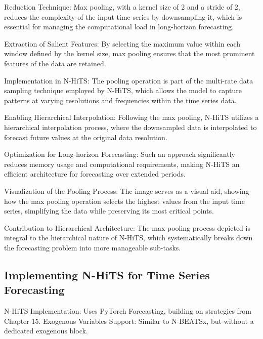 \documentclass{article}
\begin{document}
Reduction Technique: Max pooling, with a kernel size of 2 and a stride of 2, reduces the complexity of the input time series by downsampling it, which is essential for managing the computational load in long-horizon forecasting.

Extraction of Salient Features: By selecting the maximum value within each window defined by the kernel size, max pooling ensures that the most prominent features of the data are retained.

Implementation in N-HiTS: The pooling operation is part of the multi-rate data sampling technique employed by N-HiTS, which allows the model to capture patterns at varying resolutions and frequencies within the time series data.

Enabling Hierarchical Interpolation: Following the max pooling, N-HiTS utilizes a hierarchical interpolation process, where the downsampled data is interpolated to forecast future values at the original data resolution.

Optimization for Long-horizon Forecasting: Such an approach significantly reduces memory usage and computational requirements, making N-HiTS an efficient architecture for forecasting over extended periods.

Visualization of the Pooling Process: The image serves as a visual aid, showing how the max pooling operation selects the highest values from the input time series, simplifying the data while preserving its most critical points.

Contribution to Hierarchical Architecture: The max pooling process depicted is integral to the hierarchical nature of N-HiTS, which systematically breaks down the forecasting problem into more manageable sub-tasks.

\subsection{Implementing N-HiTS for Time Series Forecasting}

N-HiTS Implementation: Uses PyTorch Forecasting, building on strategies from Chapter 15.
Exogenous Variables Support: Similar to N-BEATSx, but without a dedicated exogenous block.
\end{document}
